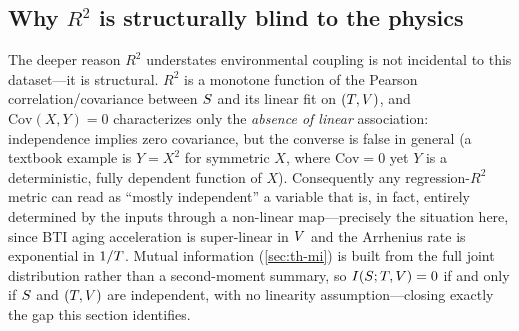\subsection{Why $R^2$ is structurally blind to the physics}
\label{sec:background-r2}
The deeper reason $R^2$ understates environmental coupling is not incidental to
this dataset---it is structural. $R^2$ is a monotone function of the Pearson
correlation/covariance between $S$ and its linear fit on $(T,V)$, and
$\mathrm{Cov}(X,Y)=0$ characterizes only the \emph{absence of linear}
association: independence implies zero covariance, but the converse is false in
general (a textbook example is $Y=X^2$ for symmetric $X$, where $\mathrm{Cov}=0$
yet $Y$ is a deterministic, fully dependent function of $X$). Consequently any
regression-$R^2$ metric can read as ``mostly independent'' a variable that is, in
fact, entirely determined by the inputs through a non-linear map---precisely the
situation here, since BTI aging acceleration is super-linear in $V$ and the
Arrhenius rate is exponential in $1/T$. Mutual information
(\cref{sec:th-mi}) is built from the full joint distribution rather than a
second-moment summary, so $I\!\left(S ; T,V\right)=0$ if and only if $S$ and
$(T,V)$ are independent, with no linearity assumption---closing exactly
the gap this section identifies.
